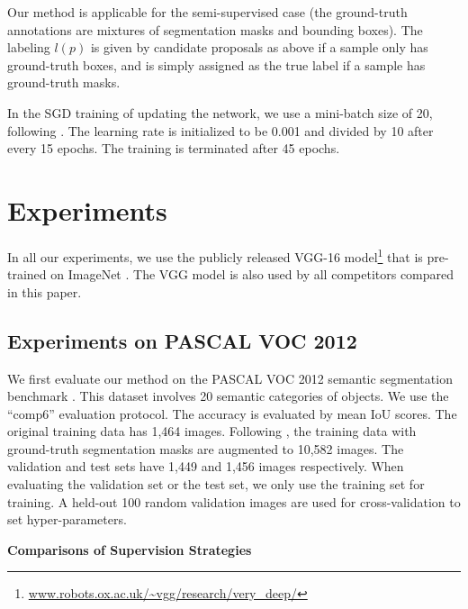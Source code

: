 \documentclass[10pt,twocolumn,letterpaper]{article}
\begin{document}
Our method is applicable for the semi-supervised case (the ground-truth annotations are mixtures of segmentation masks and bounding boxes). The labeling $l(p)$ is given by candidate proposals as above if a sample only has ground-truth boxes, and is simply assigned as the true label if a sample has ground-truth masks.

In the SGD training of updating the network, we use a mini-batch size of 20, following \cite{Long2015}. The learning rate is initialized to be 0.001 and divided by 10 after every 15 epochs. The training is terminated after 45 epochs.



\section{Experiments}


In all our experiments, we use the publicly released VGG-16 model\footnote{\url{www.robots.ox.ac.uk/~vgg/research/very_deep/}} \cite{Simonyan2015} that is pre-trained on ImageNet \cite{Russakovsky2014}. The VGG model is also used by all competitors \cite{Long2015,Hariharan2015,Dai2015,Chen2015,mostajabi2014feedforward} compared in this paper.


\subsection{Experiments on PASCAL VOC 2012}

We first evaluate our method on the PASCAL VOC 2012 semantic segmentation benchmark \cite{everingham2010pascal}. This dataset involves 20 semantic categories of objects. We use the ``comp6'' evaluation protocol.
The accuracy is evaluated by mean IoU scores.
The original training data has 1,464 images.
Following \cite{hariharan2011semantic}, the training data with ground-truth segmentation masks are augmented to 10,582 images. The validation and test sets have 1,449 and 1,456 images respectively. When evaluating the validation set or the test set, we only use the training set for training.
A held-out 100 random validation images are used for cross-validation to set hyper-parameters.

\vspace{8pt}
\noindent\textbf{Comparisons of Supervision Strategies}
\end{document}
